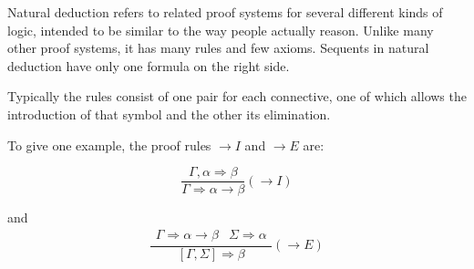 \documentclass[12pt]{article}
\begin{document}
Natural deduction refers to related proof systems for several different kinds of logic, intended to be similar to the way people actually reason. Unlike many other proof systems, it has many rules and few axioms.  Sequents in natural deduction have only one formula on the right side.

Typically the rules consist of one pair for each connective, one of which allows the introduction of that symbol and the other its elimination.

To give one example, the proof rules $\rightarrow I$ and $\rightarrow E$ are:

$$\frac{\Gamma,\alpha\Rightarrow\beta}{\Gamma\Rightarrow\alpha\rightarrow\beta}
(\rightarrow I)$$

and $$\frac{\begin{array}{cc}\Gamma\Rightarrow\alpha\rightarrow\beta &\Sigma\Rightarrow\alpha\end{array}}{[\Gamma,\Sigma]\Rightarrow\beta}
(\rightarrow E)$$
\end{document}
